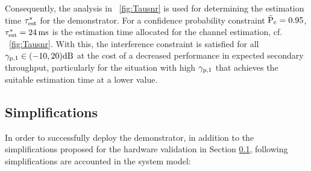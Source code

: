 Consequently, the analysis in \figurename~\ref{fig:Tausnr} is used for determining the estimation time ${\tau}^*_{\text{est}}$ for the demonstrator. For a confidence probability constraint $\bar{\text{P}}_{\text{c}} = 0.95$, ${\tau}^*_{\text{est}} = \SI{24}{ms}$ is the estimation time allocated for the channel estimation, cf. \figurename~\ref{fig:Tausnr}. With this, the interference constraint is satisfied for all ${\gamma}_{\text{p,1}} \in (-10,20)\SI{}{dB}$ at the cost of a decreased performance in expected secondary throughput, particularly for the situation with high ${\gamma}_{\text{p,1}}$ that achieves the suitable estimation time at a lower value.


\subsection{Simplifications}
\label{ssec:simp2}
In order to successfully deploy the demonstrator, in addition to the simplifications proposed for the hardware validation in Section \ref{ssec:simp2}, following simplifications are accounted in the system model: 


